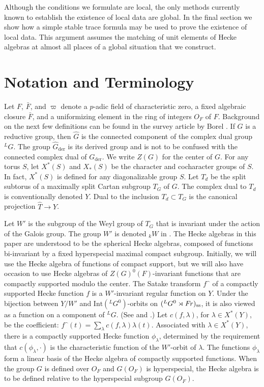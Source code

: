 \documentclass{amsart}
\newcommand\Fr{\text{$F\hskip-.1em r$}}
\newcommand\der{{\text{der}}}
\begin{document}
Although the conditions we formulate are local, the only methods
currently known to establish the existence of local data are global.
In the final section we show how a simple stable
trace formula 
may be used to prove the existence of local data.  This argument
assumes the matching of unit elements of Hecke algebras at almost
all places of a global situation that we construct.

\section{Notation and Terminology }%

Let $F$, $\bar F$, and $\varpi$  denote a $p$-adic
field of characteristic zero, 
a fixed algebraic closure $\bar F$, 
and a uniformizing element
in the ring of integers $O_F$ of $F$.  Background
on the next few definitions can be found in the survey article by
Borel \cite{B}.
If $G$ is a reductive
group, then  $\hat G$ is the connected component of the
complex dual group ${}^L\!G$.  The group $\hat G_\der$ is
its derived group and is not to be confused with the connected
complex dual of $G_\der$.  We write $Z(G)$ for
the center of $G$.  
For any torus $S$, let $X^*(S)$ and 
$X_*(S)$ be the character and cocharacter groups of $S$.
In fact, $X^*(S)$ is defined for any diagonalizable group $S$.
Let $T_d$ be the split subtorus of a maximally
split Cartan subgroup $T_G$ of $G$.
The complex dual to $T_d$ is conventionally denoted $Y$.
Dual to the inclusion $T_d \subset T_G$ is the
canonical projection $\hat T \to Y$.

Let $W'$ is the subgroup of the Weyl group of $T_G$ that is
invariant under the action of the Galois group.
The group $W'$ is denoted ${}_k\!W$ in \cite{B}.
The Hecke algebras in this paper are understood to be
the spherical Hecke algebras, composed of functions bi-invariant
by a fixed hyperspecial maximal compact subgroup.  Initially,
we will use the Hecke algebra of functions of compact support,
but we will also have occasion to use Hecke algebras of
$Z(G)^0(F)$-invariant functions that
are compactly supported modulo the center.  
The Satake transform $f\hat{\phantom{o}}$ of a compactly supported Hecke
function $f$ is 
a $W'$-invariant regular function
on $Y$.  Under the bijection between $Y/W'$ and $\text{Int}({}^LG^0)$-orbits
on $({}^LG^0\rtimes\Fr)_{\text{ss}}$, it is also viewed as a
function on a component of ${}^L\!G$.  (See \cite{M} and \cite{B}.)
Let $c(f,\lambda)$, for $\lambda\in X^*(Y)$, be the coefficient:
$f\hat{\phantom{o}}(t) = \sum_\lambda c(f,\lambda) \lambda(t)$.
Associated with $\lambda\in X^*(Y)$,
there is a compactly supported Hecke function $\phi_\lambda$,
determined by the requirement that $c(\phi_\lambda,\cdot)$
is the characteristic function of the $W'$-orbit of $\lambda$.
The functions $\phi_\lambda$
form a linear basis of the Hecke algebra of compactly supported
functions.  When the group $G$ is defined over $O_F$ and
$G(O_F)$ is hyperspecial, the
Hecke algebra is to be defined relative to the hyperspecial
subgroup $G(O_F)$.
\end{document}

